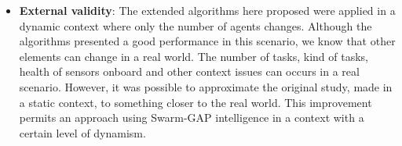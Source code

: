 \begin{itemize}
   \item \textbf{External validity}: The extended algorithms here proposed were applied in a dynamic context where only the number of agents changes. Although the algorithms presented a good performance in this scenario, we know that other elements can change in a real world. The number of tasks, kind of tasks, health of sensors onboard and other context issues can occurs in a real scenario. However, it was possible to approximate the original study, made in a static context, to something closer to the real world. This improvement permits an approach using Swarm-GAP intelligence in a context with a certain level of dynamism.
\end{itemize}

